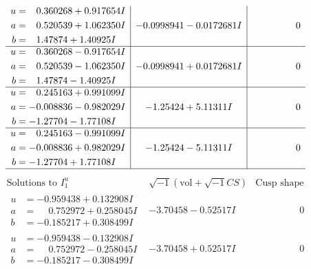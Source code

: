\documentclass[1p]{elsarticle_modified}
\theoremstyle{definition}
\newcommand{\I}{\sqrt{-1}}
\begin{document}
$$\begin{array}{c|c|c}
\begin{aligned}
u &= \phantom{-}0.360268 + 0.917654 I \\
a &= \phantom{-}0.520539 + 1.062350 I \\
b &= \phantom{-}1.47874 + 1.40925 I\end{aligned}
 & -0.0998941 - 0.0172681 I & \phantom{-0.000000 } 0 \\ \hline\begin{aligned}
u &= \phantom{-}0.360268 - 0.917654 I \\
a &= \phantom{-}0.520539 - 1.062350 I \\
b &= \phantom{-}1.47874 - 1.40925 I\end{aligned}
 & -0.0998941 + 0.0172681 I & \phantom{-0.000000 } 0 \\ \hline\begin{aligned}
u &= \phantom{-}0.245163 + 0.991099 I \\
a &= -0.008836 - 0.982029 I \\
b &= -1.27704 - 1.77108 I\end{aligned}
 & -1.25424 + 5.11311 I & \phantom{-0.000000 } 0 \\ \hline\begin{aligned}
u &= \phantom{-}0.245163 - 0.991099 I \\
a &= -0.008836 + 0.982029 I \\
b &= -1.27704 + 1.77108 I\end{aligned}
 & -1.25424 - 5.11311 I & \phantom{-0.000000 } 0\\
 \hline 
 \end{array}$$\newpage$$\begin{array}{c|c|c}  
\text{Solutions to }I^u_{1}& \I (\text{vol} + \sqrt{-1}CS) & \text{Cusp shape}\\
 \hline 
\begin{aligned}
u &= -0.959438 + 0.132908 I \\
a &= \phantom{-}0.752972 + 0.258045 I \\
b &= -0.185217 + 0.308499 I\end{aligned}
 & -3.70458 - 0.52517 I & \phantom{-0.000000 } 0 \\ \hline\begin{aligned}
u &= -0.959438 - 0.132908 I \\
a &= \phantom{-}0.752972 - 0.258045 I \\
b &= -0.185217 - 0.308499 I\end{aligned}
 & -3.70458 + 0.52517 I & \phantom{-0.000000 } 0 \\ \hline\begin{aligned}

\end{aligned}
\end{array}$$
\end{document}
